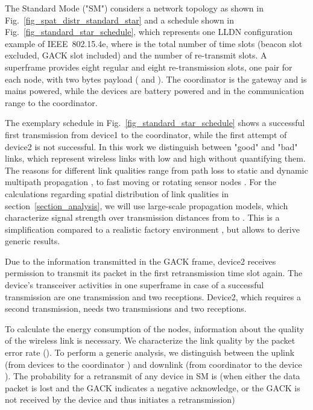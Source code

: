\documentclass[times,10pt,twocolumn]{article}
\begin{document}
The Standard Mode ("SM") considers a network topology as shown in Fig.~\ref{fig_spat_distr_standard_star} and a schedule shown in Fig.~\ref{fig_standard_star_schedule}, which represents one LLDN configuration example of IEEE~802.15.4e, where  is the total number of time slots (beacon slot excluded, GACK slot included) and  the number of re-transmit slots. A  superframe provides eight regular and eight re-transmission slots, one pair for each node, with two bytes payload ( and ). The coordinator is the gateway and is mains powered, while the devices are battery powered and in the communication range to the coordinator.

The exemplary schedule in Fig.~\ref{fig_standard_star_schedule} shows a successful first transmission from device1 to the coordinator, while the first attempt of device2 is not successful. In this work we distinguish between "good" and "bad" links, which represent wireless links with low and high  without quantifying them. The reasons for different link qualities range from path loss to static and dynamic multipath propagation \cite{fundamentals_wireless_comm}, \cite{channel_measurements_koerber_scholl} to fast moving or rotating sensor nodes \cite{PER_for_rotating_sensor_nodes} \cite{speed_dependent_PER}. For the calculations regarding spatial distribution of link qualities in section~\ref{section_analysis}, we will use large-scale propagation models, which characterize signal strength over transmission distances from  to  \cite{RAPP}. This is a simplification compared to a realistic factory environment \cite{channel_measurement_for_802_15_4_transceiver}, but allows to derive generic results.

Due to the information transmitted in the GACK frame, device2 receives permission to transmit its packet in the first retransmission time slot  again. The device's transceiver activities in one superframe in case of a successful transmission are one transmission and two receptions. Device2, which requires a second transmission, needs two transmissions and two receptions.

To calculate the energy consumption of the nodes, information about the quality of the wireless link is necessary. We characterize the link quality by the packet error rate (). To perform a generic analysis, we distinguish between the uplink  (from devices to the coordinator ) and downlink  (from coordinator to the device ). The probability for a retransmit of any device in SM is (when either the data packet is lost and the GACK indicates a negative acknowledge, or the GACK is not received by the device and thus initiates a retransmission)
\end{document}
